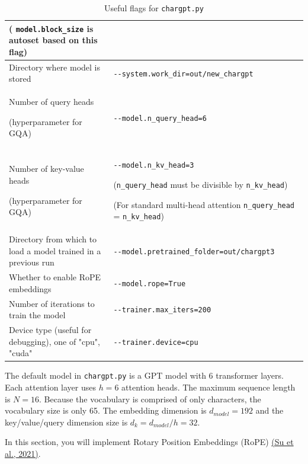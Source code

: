 \documentclass[11pt,addpoints,answers]{exam}
\begin{document}
\begin{questions}
\begin{table}[h!]
\begin{tabular}{|p{0.35\linewidth}|p{0.65\linewidth}|}
( \lstinline|model.block_size| is autoset based on this flag) \\ \hline
Directory where model is stored &  \lstinline|--system.work_dir=out/new_chargpt| \\ \hline
Number of query heads 

(hyperparameter for GQA) &  \lstinline|--model.n_query_head=6| \\ \hline
Number of key-value heads 

(hyperparameter for GQA) &  \lstinline|--model.n_kv_head=3| 

(\lstinline|n_query_head| must be divisible by \lstinline|n_kv_head|) 

(For standard multi-head attention \lstinline|n_query_head| = \lstinline|n_kv_head|)\\ \hline
Directory from which to load a model trained in a previous run &  \lstinline|--model.pretrained_folder=out/chargpt3| \\ \hline
Whether to enable RoPE embeddings &  \lstinline|--model.rope=True| \\ \hline
Number of iterations to train the model & \lstinline|--trainer.max_iters=200| \\ \hline
Device type (useful for debugging), one of "cpu", "cuda"  & \lstinline|--trainer.device=cpu| \\ \hline
\end{tabular}
\caption{Useful flags for \lstinline{chargpt.py}}
\label{table:flag}
\end{table}


The default model in \lstinline{chargpt.py} is a GPT model with 6 transformer layers. Each attention layer uses $h=6$ attention heads. The maximum sequence length is $N=16$. Because the vocabulary is comprised of only characters, the vocabulary size is only 65. The embedding dimension is $d_{model} = 192$ and the key/value/query dimension size is $d_k = d_{model}/h =32$. 

\clearpage


    In this section, you will implement Rotary Position Embeddings (RoPE) \href{https://arxiv.org/pdf/2104.09864.pdf}{(Su et al., 2021)}. 



\end{questions}
\end{document}
